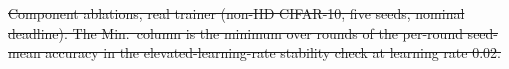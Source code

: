\documentclass[preprint,12pt]{elsarticle}
\providecommand{\DIFdel}[1]{{\protect\color{red}\sout{#1}}}                      %
\providecommand{\DIFdelFL}[1]{\DIFdel{#1}} %
\begin{document}
{%
\DIFdelFL{Component ablations, real trainer (non-IID CIFAR-10, five seeds, nominal deadline). The Min.\ column is the minimum over rounds of the per-round seed-mean accuracy in the elevated-learning-rate stability check at learning rate 0.02.}}

\end{document}
